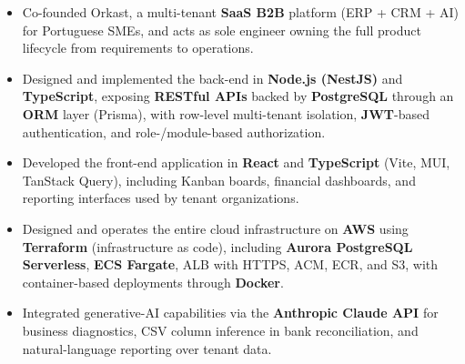 \documentclass[10pt,a4paper,ragged2e]{altacv}
\begin{document}
\begin{itemize}
	\item Co-founded Orkast, a multi-tenant \textbf{SaaS B2B} platform (ERP + CRM + AI) for Portuguese SMEs, and acts as sole engineer owning the full product lifecycle from requirements to operations.
	\item Designed and implemented the back-end in \textbf{Node.js (NestJS)} and \textbf{TypeScript}, exposing \textbf{RESTful APIs} backed by \textbf{PostgreSQL} through an \textbf{ORM} layer (Prisma), with row-level multi-tenant isolation, \textbf{JWT}-based authentication, and role-/module-based authorization.
	\item Developed the front-end application in \textbf{React} and \textbf{TypeScript} (Vite, MUI, TanStack Query), including Kanban boards, financial dashboards, and reporting interfaces used by tenant organizations.
	\item Designed and operates the entire cloud infrastructure on \textbf{AWS} using \textbf{Terraform} (infrastructure as code), including \textbf{Aurora PostgreSQL Serverless}, \textbf{ECS Fargate}, ALB with HTTPS, ACM, ECR, and S3, with container-based deployments through \textbf{Docker}.
	\item Integrated generative-AI capabilities via the \textbf{Anthropic Claude API} for business diagnostics, CSV column inference in bank reconciliation, and natural-language reporting over tenant data.
\end{itemize}

\divider%


\end{document}
